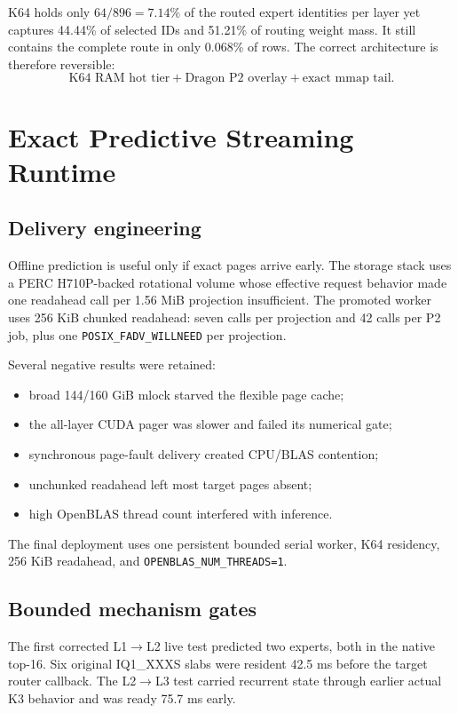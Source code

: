 \documentclass[11pt]{article}
\begin{document}
K64 holds only $64/896=7.14\%$ of the routed expert identities per layer yet captures 44.44\% of selected IDs and 51.21\% of routing weight mass. It still contains the complete route in only 0.068\% of rows. The correct architecture is therefore reversible:
\begin{equation}
\boxed{\text{K64 RAM hot tier}+\text{Dragon P2 overlay}+\text{exact mmap tail}.}
\end{equation}

\section{Exact Predictive Streaming Runtime}

\subsection{Delivery engineering}

Offline prediction is useful only if exact pages arrive early. The storage stack uses a PERC H710P-backed rotational volume whose effective request behavior made one readahead call per 1.56 MiB projection insufficient. The promoted worker uses 256 KiB chunked readahead: seven calls per projection and 42 calls per P2 job, plus one \texttt{POSIX\_FADV\_WILLNEED} per projection.

Several negative results were retained:
\begin{itemize}
  \item broad 144/160 GiB mlock starved the flexible page cache;
  \item the all-layer CUDA pager was slower and failed its numerical gate;
  \item synchronous page-fault delivery created CPU/BLAS contention;
  \item unchunked readahead left most target pages absent;
  \item high OpenBLAS thread count interfered with inference.
\end{itemize}
The final deployment uses one persistent bounded serial worker, K64 residency, 256 KiB readahead, and \texttt{OPENBLAS\_NUM\_THREADS=1}.

\subsection{Bounded mechanism gates}

The first corrected L1$\rightarrow$L2 live test predicted two experts, both in the native top-16. Six original IQ1\_XXXS slabs were resident 42.5 ms before the target router callback. The L2$\rightarrow$L3 test carried recurrent state through earlier actual K3 behavior and was ready 75.7 ms early.
\end{document}
